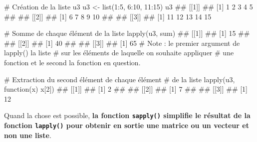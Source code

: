 \documentclass[12pt,twosided, notitlepage]{book}
\newenvironment{Shaded}{}{}
\newcommand{\CommentTok}[1]{\textcolor[rgb]{0.00,0.50,0.00}{#1}}
\newcommand{\ControlFlowTok}[1]{\textcolor[rgb]{0.00,0.00,1.00}{#1}}
\newcommand{\DecValTok}[1]{#1}
\newcommand{\KeywordTok}[1]{\textcolor[rgb]{0.00,0.00,1.00}{#1}}
\newcommand{\NormalTok}[1]{#1}
\newcommand{\OperatorTok}[1]{#1}
\newcommand{\StringTok}[1]{\textcolor[rgb]{0.00,0.50,0.50}{#1}}
\renewenvironment{Shaded}{\begin{snugshade}}{\end{snugshade}}
\begin{document}
\begin{Shaded}
\begin{Highlighting}[]
\CommentTok{# Création de la liste u3}
\NormalTok{u3 <-}\StringTok{ }\KeywordTok{list}\NormalTok{(}\DecValTok{1}\OperatorTok{:}\DecValTok{5}\NormalTok{, }\DecValTok{6}\OperatorTok{:}\DecValTok{10}\NormalTok{, }\DecValTok{11}\OperatorTok{:}\DecValTok{15}\NormalTok{)}
\NormalTok{u3}
\NormalTok{  ## [[1]]}
\NormalTok{  ## [1] 1 2 3 4 5}
\NormalTok{  ## }
\NormalTok{  ## [[2]]}
\NormalTok{  ## [1]  6  7  8  9 10}
\NormalTok{  ## }
\NormalTok{  ## [[3]]}
\NormalTok{  ## [1] 11 12 13 14 15}

\CommentTok{# Somme de chaque élément de la liste}
\KeywordTok{lapply}\NormalTok{(u3, sum)}
\NormalTok{  ## [[1]]}
\NormalTok{  ## [1] 15}
\NormalTok{  ## }
\NormalTok{  ## [[2]]}
\NormalTok{  ## [1] 40}
\NormalTok{  ## }
\NormalTok{  ## [[3]]}
\NormalTok{  ## [1] 65}
\CommentTok{# Note : le premier argument de lapply() la liste}
\CommentTok{# sur les éléments de laquelle on souhaite appliquer}
\CommentTok{# une fonction et le second la fonction en question.}

\CommentTok{# Extraction du second élément de chaque élément}
\CommentTok{# de la liste}
\KeywordTok{lapply}\NormalTok{(u3, }\ControlFlowTok{function}\NormalTok{(x) x[}\DecValTok{2}\NormalTok{])}
\NormalTok{  ## [[1]]}
\NormalTok{  ## [1] 2}
\NormalTok{  ## }
\NormalTok{  ## [[2]]}
\NormalTok{  ## [1] 7}
\NormalTok{  ## }
\NormalTok{  ## [[3]]}
\NormalTok{  ## [1] 12}
\end{Highlighting}
\end{Shaded}

Quand la chose est possible, \textbf{la fonction \texttt{sapply()}
simplifie le résultat de la fonction \texttt{lapply()} pour obtenir en
sortie une matrice ou un vecteur et non une
liste}.
\end{document}
